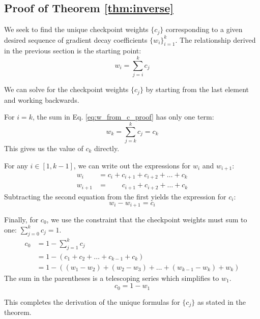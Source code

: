 \subsection{Proof of Theorem \ref{thm:inverse}}

We seek to find the unique checkpoint weights $\{c_j\}$ corresponding to a given desired sequence of gradient decay coefficients $\{w_i\}_{i=1}^k$. The relationship derived in the previous section is the starting point:
\begin{equation}
w_i = \sum_{j=i}^{k} c_j
\label{eq:w_from_c_proof}
\end{equation}

We can solve for the checkpoint weights $\{c_j\}$ by starting from the last element and working backwards.

For $i = k$, the sum in Eq. \ref{eq:w_from_c_proof} has only one term:
\begin{equation}
w_k = \sum_{j=k}^{k} c_j = c_k
\label{eq:proof_ck}
\end{equation}
This gives us the value of $c_k$ directly.

For any $i \in [1, k-1]$, we can write out the expressions for $w_i$ and $w_{i+1}$:
\begin{align*}
w_i &= c_i + c_{i+1} + c_{i+2} + \dots + c_k \\
w_{i+1} &= \qquad c_{i+1} + c_{i+2} + \dots + c_k
\end{align*}
Subtracting the second equation from the first yields the expression for $c_i$:
\begin{equation}
w_i - w_{i+1} = c_i
\label{eq:proof_cj}
\end{equation}

Finally, for $c_0$, we use the constraint that the checkpoint weights must sum to one: $\sum_{j=0}^{k} c_j = 1$.
\begin{align}
c_0 &= 1 - \sum_{j=1}^{k} c_j \nonumber \\
&= 1 - \left( c_1 + c_2 + \dots + c_{k-1} + c_k \right) \nonumber \\
&= 1 - \left( (w_1 - w_2) + (w_2 - w_3) + \dots + (w_{k-1} - w_k) + w_k \right) \label{eq:telescoping_sum}
\end{align}
The sum in the parentheses is a telescoping series which simplifies to $w_1$.
\begin{equation}
c_0 = 1 - w_1
\label{eq:proof_c0}
\end{equation}

This completes the derivation of the unique formulas for $\{c_j\}$ as stated in the theorem.

